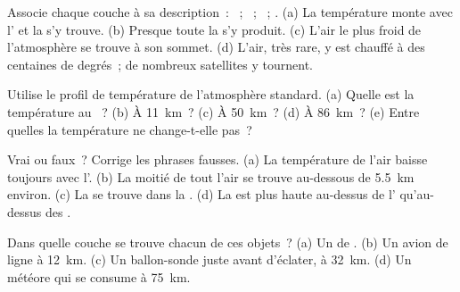 \begin{exercise}[$\star$]\label{exo:g8:the-atmosphere:1}
Associe chaque couche à sa description~: ~; ~;
~; . (a) La température monte avec l' et la
 s'y trouve. (b) Presque toute la  s'y produit. (c)
L'air le plus froid de l'atmosphère se trouve à son sommet. (d) L'air,
très rare, y est chauffé à des centaines de degrés~; de nombreux
satellites y tournent.
\end{exercise}

\begin{exercise}[$\star$]\label{exo:g8:the-atmosphere:2}
Utilise le profil de température de l'atmosphère standard. (a) Quelle est
la température au ~? (b) À \qty{11}{km}~? (c) À
\qty{50}{km}~? (d) À \qty{86}{km}~? (e) Entre quelles  la
température ne change-t-elle pas~?
\end{exercise}

\begin{exercise}[$\star$]\label{exo:g8:the-atmosphere:3}
Vrai ou faux~? Corrige les phrases fausses. (a) La température de l'air
baisse toujours avec l'. (b) La moitié de tout l'air se trouve
au-dessous de \qty{5.5}{km} environ. (c) La  se trouve dans
la . (d) La  est plus haute au-dessus de l'
qu'au-dessus des .
\end{exercise}

\begin{exercise}[$\star$]\label{exo:g8:the-atmosphere:4}
Dans quelle couche se trouve chacun de ces objets~? (a) Un  de .
(b) Un avion de ligne à \qty{12}{km}. (c) Un ballon-sonde juste avant
d'éclater, à \qty{32}{km}. (d) Un météore qui se consume à \qty{75}{km}.
\end{exercise}

